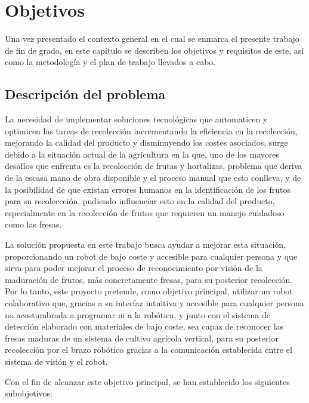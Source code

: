 \chapter{Objetivos}
\label{cap:capitulo2}
Una vez presentado el contexto general en el cual se enmarca el presente trabajo de fin de grado, en este capítulo se describen los objetivos y requisitos de este, así como la metodología y el plan de trabajo llevados a cabo.\\

\section{Descripción del problema}
\label{sec:descripcion}

La necesidad de implementar soluciones tecnológicas que automaticen y optimicen las tareas de recolección incrementando la eficiencia en la recolección, mejorando la calidad del producto y disminuyendo los costes asociados, surge debido a la situación actual de la agricultura en la que, uno de los mayores desafíos que enfrenta es la recolección de frutas y hortalizas, problema que deriva de la escasa mano de obra disponible y el proceso manual que esto conlleva, y de la posibilidad de que existan errores humanos en la identificación de los frutos para su recoleccción, pudiendo influenciar esto en la calidad del producto, especialmente en la recolección de frutos que requieren un manejo cuidadoso como las fresas.

La solución propuesta en este trabajo busca ayudar a mejorar esta situación,
proporcionando un robot de bajo coste y accesible para cualquier persona y que sirva para poder mejorar el proceso de reconocimiento por visión de la maduración de frutos, más concretamente fresas, para su posterior recolección. Por lo tanto, este proyecto pretende, como objetivo principal, utilizar un robot colaborativo que, gracias a su interfaz intuitiva y accesible para cualquier persona no acostumbrada a programar ni a la robótica, y junto con el sistema de detección elaborado con materiales de bajo coste, sea capaz de reconocer las fresas maduras de un sistema de cultivo agrícola vertical, para su posterior recolección por el brazo robótico gracias a la comunicación establecida entre el sistema de visión y el robot. 

Con el fin de alcanzar este objetivo principal, se han establecido los siguientes
subobjetivos:

